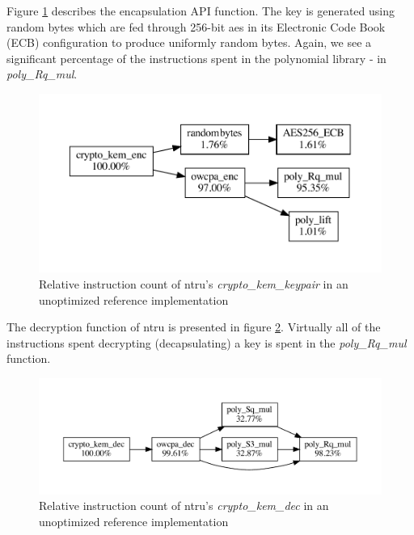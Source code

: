 \noindent Figure \ref{figure:result:hot-paths:ntru:crypto_kem_enc} describes the encapsulation API function. The key is generated using random bytes which are fed through 256-bit \gls{aes} in its Electronic Code Book (ECB) configuration to produce uniformly random bytes. Again, we see a significant percentage of the instructions spent in the polynomial library - in \textit{poly\_Rq\_mul}.

\begin{figure}[H]
    \centering
    \includegraphics[scale=0.5]{chapters/results/hot-paths/ntru/crypto_kem_enc.pdf}
    \caption{Relative instruction count of \gls{ntru}'s \textit{crypto\_kem\_keypair} in an unoptimized reference implementation}
    \label{figure:result:hot-paths:ntru:crypto_kem_enc}
\end{figure}

\noindent The decryption function of \gls{ntru} is presented in figure \ref{figure:result:hot-paths:ntru:crypto_kem_dec}. Virtually all of the instructions spent decrypting (decapsulating) a key is spent in the \textit{poly\_Rq\_mul} function.

\begin{figure}[H]
    \centering
    \includegraphics[scale=0.5]{chapters/results/hot-paths/ntru/crypto_kem_dec.pdf}
    \caption{Relative instruction count of \gls{ntru}'s \textit{crypto\_kem\_dec} in an unoptimized reference implementation}
    \label{figure:result:hot-paths:ntru:crypto_kem_dec}
\end{figure}

